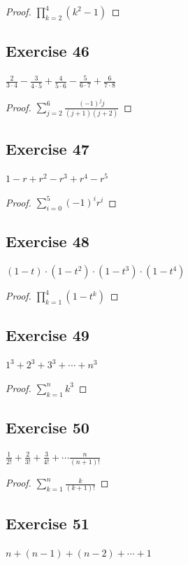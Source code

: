 \documentclass[14pt]{extarticle}
\newcommand{\dps}{\displaystyle}
\begin{document}
\begin{proof}
$\dps\prod_{k=2}^{4}(k^2-1)$
\end{proof}

\subsection{Exercise 46}
$\dps\frac{2}{3\cdot4} - \frac{3}{4\cdot5} + \frac{4}{5\cdot6} - \frac{5}{6\cdot7} + \frac{6}{7\cdot8}$

\begin{proof}
$\dps\sum_{j=2}^{6}\frac{(-1)^j j}{(j+1)(j+2)}$
\end{proof}

\subsection{Exercise 47}
$1 - r + r^2 - r^3 + r^4 - r^5$

\begin{proof}
$\dps\sum_{i = 0}^{5}(-1)^i r^i$
\end{proof}

\subsection{Exercise 48}
$(1 - t)\cdot(1 - t^2)\cdot(1 - t^3)\cdot(1 - t^4)$

\begin{proof}
$\dps\prod_{k=1}^{4}(1-t^k)$
\end{proof}

\subsection{Exercise 49}
$1^3 + 2^3 + 3^3 + \cdots + n^3$

\begin{proof}
$\dps\sum_{k=1}^{n}k^3$
\end{proof}

\subsection{Exercise 50}
$\dps \frac{1}{2!} + \frac{2}{3!} + \frac{3}{4!} + \cdots \frac{n}{(n+1)!}$

\begin{proof}
$\dps\sum_{k=1}^{n}\frac{k}{(k+1)!}$
\end{proof}

\subsection{Exercise 51}
$n + (n - 1) + (n - 2) + \cdots + 1$
\end{document}

